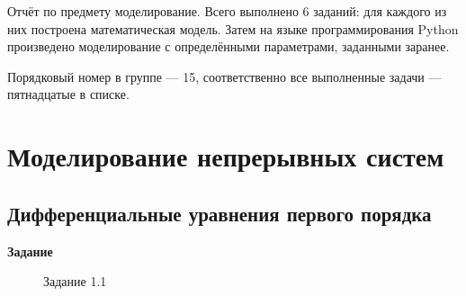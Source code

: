 \documentclass[otchet]{SCWorks}
\begin{document}

\date{2025}

\maketitle






\sloppy

\intro

Отчёт по предмету моделирование. Всего выполнено 6 заданий: для каждого из них
построена математическая модель. Затем на языке программирования Python 
произведено моделирование с определёнными параметрами, заданными заранее.

Порядковый номер в группе — 15, соответственно все выполненные задачи — пятнадцатые
в списке.

\section{Моделирование непрерывных систем}

\subsection{Дифференциальные уравнения первого порядка}

\textbf{Задание}

\begin{figure}[H]
	\caption{Задание 1.1}
	\label{pic1}
\end{figure}
\end{document}
